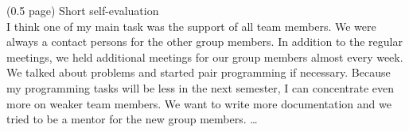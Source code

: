 (0.5 page) 
Short self-evaluation\\
I think one of my main task was the support of all team members. We were always a
contact persons for the other group members. In addition to the regular meetings, we held
additional meetings for our group members almost every week. We talked about problems
and started pair programming if necessary. Because my programming tasks will be less in
the next semester, I can concentrate even more on weaker team members. We want to
write more documentation and we tried to be a mentor for the new group members.
\dots